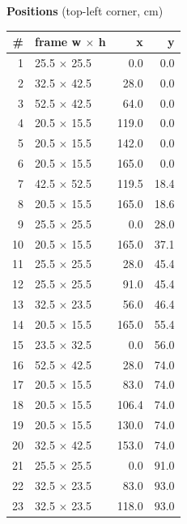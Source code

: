 \documentclass[a4paper,landscape,10pt]{article}
\begin{document}
\begin{minipage}[t]{0.25\textwidth}
\vspace{8pt}
{\bfseries Positions} (top-left corner, cm)\\[2pt]
\tiny
\begin{tabular}{@{}r l r r@{}}
\toprule
\# & frame w $\times$ h & x & y \\
\midrule
1 & 25.5 $\times$ 25.5 & 0.0 & 0.0 \\
2 & 32.5 $\times$ 42.5 & 28.0 & 0.0 \\
3 & 52.5 $\times$ 42.5 & 64.0 & 0.0 \\
4 & 20.5 $\times$ 15.5 & 119.0 & 0.0 \\
5 & 20.5 $\times$ 15.5 & 142.0 & 0.0 \\
6 & 20.5 $\times$ 15.5 & 165.0 & 0.0 \\
7 & 42.5 $\times$ 52.5 & 119.5 & 18.4 \\
8 & 20.5 $\times$ 15.5 & 165.0 & 18.6 \\
9 & 25.5 $\times$ 25.5 & 0.0 & 28.0 \\
10 & 20.5 $\times$ 15.5 & 165.0 & 37.1 \\
11 & 25.5 $\times$ 25.5 & 28.0 & 45.4 \\
12 & 25.5 $\times$ 25.5 & 91.0 & 45.4 \\
13 & 32.5 $\times$ 23.5 & 56.0 & 46.4 \\
14 & 20.5 $\times$ 15.5 & 165.0 & 55.4 \\
15 & 23.5 $\times$ 32.5 & 0.0 & 56.0 \\
16 & 52.5 $\times$ 42.5 & 28.0 & 74.0 \\
17 & 20.5 $\times$ 15.5 & 83.0 & 74.0 \\
18 & 20.5 $\times$ 15.5 & 106.4 & 74.0 \\
19 & 20.5 $\times$ 15.5 & 130.0 & 74.0 \\
20 & 32.5 $\times$ 42.5 & 153.0 & 74.0 \\
21 & 25.5 $\times$ 25.5 & 0.0 & 91.0 \\
22 & 32.5 $\times$ 23.5 & 83.0 & 93.0 \\
23 & 32.5 $\times$ 23.5 & 118.0 & 93.0 \\
\bottomrule
\end{tabular}
\end{minipage}
\clearpage
\end{document}
